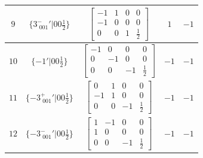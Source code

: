 \documentclass[fleqn,8pt]{jsarticle}
\begin{document}
\begin{longtable}{ccccc}
$ 9 $ & $ \{3^{-}_{\,\,001}{}'|0 0 \frac{1}{2}\} $ & $ \begin{bmatrix} -1 & 1 & 0 & 0 \\ -1 & 0 & 0 & 0 \\ 0 & 0 & 1 & \frac{1}{2} \end{bmatrix} $ & $ 1 $ & $ -1 $ \\ \hline
$ 10 $ & $ \{-1{}'|0 0 \frac{1}{2}\} $ & $ \begin{bmatrix} -1 & 0 & 0 & 0 \\ 0 & -1 & 0 & 0 \\ 0 & 0 & -1 & \frac{1}{2} \end{bmatrix} $ & $ -1 $ & $ -1 $ \\ \hline
$ 11 $ & $ \{-3^{+}_{\,\,001}{}'|0 0 \frac{1}{2}\} $ & $ \begin{bmatrix} 0 & 1 & 0 & 0 \\ -1 & 1 & 0 & 0 \\ 0 & 0 & -1 & \frac{1}{2} \end{bmatrix} $ & $ -1 $ & $ -1 $ \\ \hline
$ 12 $ & $ \{-3^{-}_{\,\,001}{}'|0 0 \frac{1}{2}\} $ & $ \begin{bmatrix} 1 & -1 & 0 & 0 \\ 1 & 0 & 0 & 0 \\ 0 & 0 & -1 & \frac{1}{2} \end{bmatrix} $ & $ -1 $ & $ -1 $ \\
\end{longtable}
\end{document}
